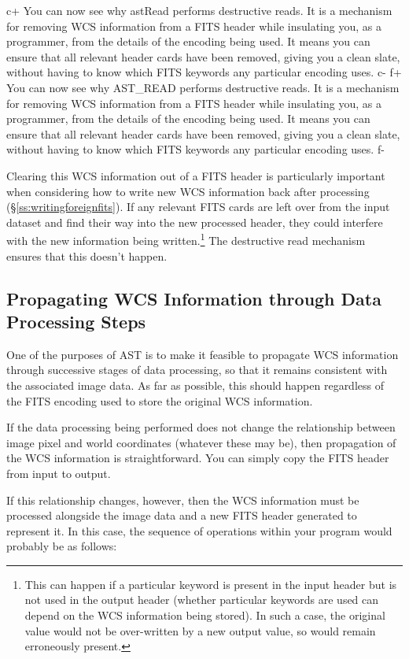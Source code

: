 \documentclass[twoside,11pt]{article}
\newcommand{\secref}[1]{\S\ref{#1}}
\newcommand{\secref}[1]{\ref{#1}}
\begin{document}
c+
You can now see why astRead performs destructive reads. It is a
mechanism for removing WCS information from a FITS header while
insulating you, as a programmer, from the details of the encoding
being used. It means you can ensure that all relevant header cards
have been removed, giving you a clean slate, without having to know
which FITS keywords any particular encoding uses.
c-
f+
You can now see why AST\_READ performs destructive reads. It is a
mechanism for removing WCS information from a FITS header while
insulating you, as a programmer, from the details of the encoding
being used. It means you can ensure that all relevant header cards
have been removed, giving you a clean slate, without having to know
which FITS keywords any particular encoding uses.
f-

Clearing this WCS information out of a FITS header is particularly
important when considering how to write new WCS information back after
processing (\secref{ss:writingforeignfits}). If any relevant FITS
cards are left over from the input dataset and find their way into the
new processed header, they could interfere with the new information
being written.\footnote{This can happen if a particular keyword is
present in the input header but is not used in the output header
(whether particular keywords are used can depend on the WCS
information being stored). In such a case, the original value would
not be over-written by a new output value, so would remain erroneously
present.} The destructive read mechanism ensures that this doesn't
happen.

\subsection{\label{ss:propagatingwcsinformation}Propagating WCS Information through Data Processing Steps}

One of the purposes of AST is to make it feasible to propagate WCS
information through successive stages of data processing, so that it
remains consistent with the associated image data. As far as possible,
this should happen regardless of the FITS encoding used to store the
original WCS information.

If the data processing being performed does not change the
relationship between image pixel and world coordinates (whatever these
may be), then propagation of the WCS information is
straightforward. You can simply copy the FITS header from input to
output.

If this relationship changes, however, then the WCS information must
be processed alongside the image data and a new FITS header generated
to represent it. In this case, the sequence of operations within your
program would probably be as follows:
\end{document}
